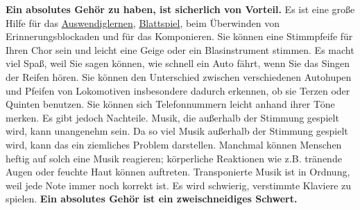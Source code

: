 \textbf{Ein absolutes Gehör zu haben, ist sicherlich von Vorteil.}
Es ist eine große Hilfe für das \hyperref[c1iii6]{Auswendiglernen}, \hyperref[c1iii11]{Blattspiel}, beim Überwinden von Erinnerungsblockaden und für das Komponieren.
Sie können eine Stimmpfeife für Ihren Chor sein und leicht eine Geige oder ein Blasinstrument stimmen.
Es macht viel Spaß, weil Sie sagen können, wie schnell ein Auto fährt, wenn Sie das Singen der Reifen hören.
Sie können den Unterschied zwischen verschiedenen Autohupen und Pfeifen von Lokomotiven insbesondere dadurch erkennen, ob sie Terzen oder Quinten benutzen.
Sie können sich Telefonnummern leicht anhand ihrer Töne merken.
Es gibt jedoch Nachteile.
Musik, die außerhalb der Stimmung gespielt wird, kann unangenehm sein.
Da so viel Musik außerhalb der Stimmung gespielt wird, kann das ein ziemliches Problem darstellen.
Manchmal können Menschen heftig auf solch eine Musik reagieren; körperliche Reaktionen wie z.B. tränende Augen oder feuchte Haut können auftreten.
Transponierte Musik ist in Ordnung, weil jede Note immer noch korrekt ist.
Es wird schwierig, verstimmte Klaviere zu spielen.
\textbf{Ein absolutes Gehör ist ein zweischneidiges Schwert.}

